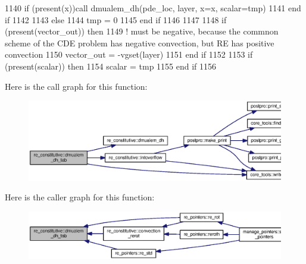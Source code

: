 \begin{DoxyCode}
1140 \textcolor{comment}{          }\textcolor{keywordflow}{if} (\textcolor{keyword}{present}(x))\textcolor{keyword}{call }dmualem_dh(pde\_loc, layer, x=x, scalar=tmp)
1141 \textcolor{keywordflow}{        end if}
1142           
1143       \textcolor{keywordflow}{else}
1144         tmp = 0
1145 \textcolor{keywordflow}{      end if}
1146       
1147 
1148       \textcolor{keywordflow}{if} (\textcolor{keyword}{present}(vector\_out)) \textcolor{keywordflow}{then}
1149         \textcolor{comment}{! must be negative, because the commnon scheme of the CDE problem has negative convection, but RE
       has positive convection}
1150         vector\_out = -vgset(layer)%
1151 \textcolor{keywordflow}{      end if}
1152 
1153       \textcolor{keywordflow}{if} (\textcolor{keyword}{present}(scalar)) \textcolor{keywordflow}{then}
1154         scalar = tmp
1155 \textcolor{keywordflow}{      end if}
1156 
\end{DoxyCode}


Here is the call graph for this function\+:\nopagebreak
\begin{figure}[H]
\begin{center}
\leavevmode
\includegraphics[width=350pt]{namespacere__constitutive_a3f619b615de841ad748f42a738bb8ff4_cgraph}
\end{center}
\end{figure}




Here is the caller graph for this function\+:\nopagebreak
\begin{figure}[H]
\begin{center}
\leavevmode
\includegraphics[width=350pt]{namespacere__constitutive_a3f619b615de841ad748f42a738bb8ff4_icgraph}
\end{center}
\end{figure}


